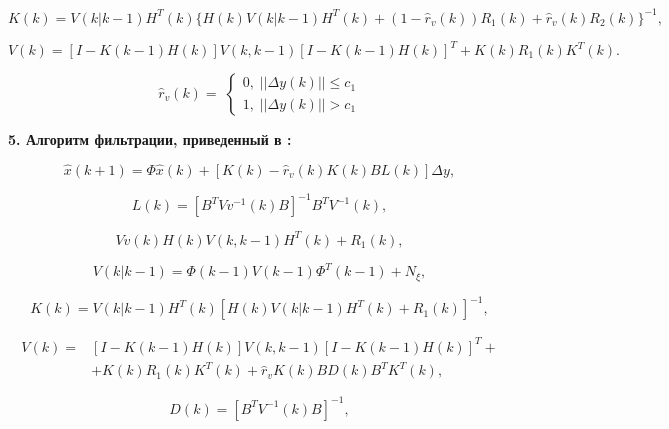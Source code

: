 \begin{equation}\label{eq3:optim4_4}
K(k)=V(k|k-1)H^T(k)\{H(k)V(k|k-1)H^T(k)+(1-\hat{r}_v(k))R_1(k)+\hat{r}_v(k)R_2(k)\}^{-1},
\end{equation}

\begin{equation}\label{eq3:optim4_5}
V(k)=[I-K(k-1)H(k)]V(k,k-1)[I-K(k-1)H(k)]^T+K(k)R_1(k)K^T(k).
\end{equation}

\begin{equation}
\hat{r}_v(k)= \;
\begin{cases}
0, \; ||\Delta y(k)||\leq c_1 \\    
1, \; ||\Delta y(k)||> c_1    
\end{cases}
\end{equation}

\textbf{5. Алгоритм фильтрации, приведенный в \cite{Klekis}:}

\begin{equation}\label{eq3:optim5}
\hat{x}(k+1)=\Phi\hat{x}(k)+[K(k)-\hat{r}_v(k)K(k)BL(k)]\Delta y,
\end{equation}

\begin{equation}\label{eq3:optim5_1}
L(k)=[B^TVv^{-1}(k)B]^{-1}B^TV^{-1}(k),
\end{equation}

\begin{equation}\label{eq3:optim5_2}
Vv(k)H(k)V(k,k-1)H^T(k)+R_1(k),
\end{equation}

\begin{equation}\label{eq3:optim5_3}
V(k|k-1)=\Phi(k-1)V(k-1)\Phi^T(k-1)+N_\xi,
\end{equation}

\begin{equation}\label{eq3:optim5_4}
K(k)=V(k|k-1)H^T(k)[H(k)V(k|k-1)H^T(k)+R_1(k)]^{-1},
\end{equation}

\begin{equation}\label{eq3:optim5_5}
\begin{split}
V(k)=&[I-K(k-1)H(k)]V(k,k-1)[I-K(k-1)H(k)]^T+\\
&+K(k)R_1(k)K^T(k)+\hat{r}_vK(k)BD(k)B^TK^T(k),
\end{split}
\end{equation}

\begin{equation}\label{eq3:optim5_6}
D(k)=[B^TV^{-1}(k)B]^{-1},
\end{equation}

